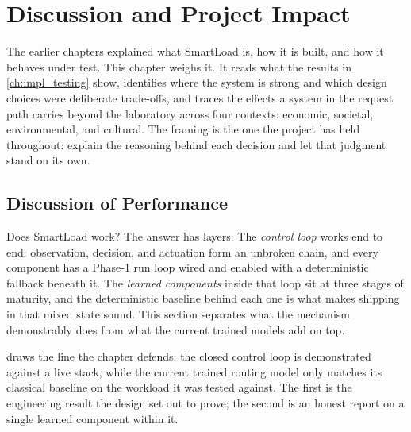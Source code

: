 \chapter{Discussion and Project Impact}
\label{ch:discussion}

The earlier chapters explained what SmartLoad is, how it is built, and how it
behaves under test. This chapter weighs it. It reads what the results in
\cref{ch:impl_testing} show, identifies where the system is strong and which design
choices were deliberate trade-offs, and traces the effects a system in the request
path carries beyond the laboratory across four contexts: economic, societal,
environmental, and cultural. The framing is the one the project has held throughout:
explain the reasoning behind each decision and let that judgment stand on its own.

\section{Discussion of Performance}
\label{disc:performance}

Does SmartLoad work? The answer has layers. The \emph{control loop} works end to
end: observation, decision, and actuation form an unbroken chain, and every
component has a Phase-1 run loop wired and enabled with a deterministic fallback
beneath it. The \emph{learned components} inside that loop sit at three stages of
maturity, and the deterministic baseline behind each one is what makes shipping in
that mixed state sound. This section separates what the mechanism demonstrably does
from what the current trained models add on top.

 draws the line the chapter defends: the closed control
loop is demonstrated against a live stack, while the current trained routing model
only matches its classical baseline on the workload it was tested against. The first
is the engineering result the design set out to prove; the second is an honest report
on a single learned component within it.

